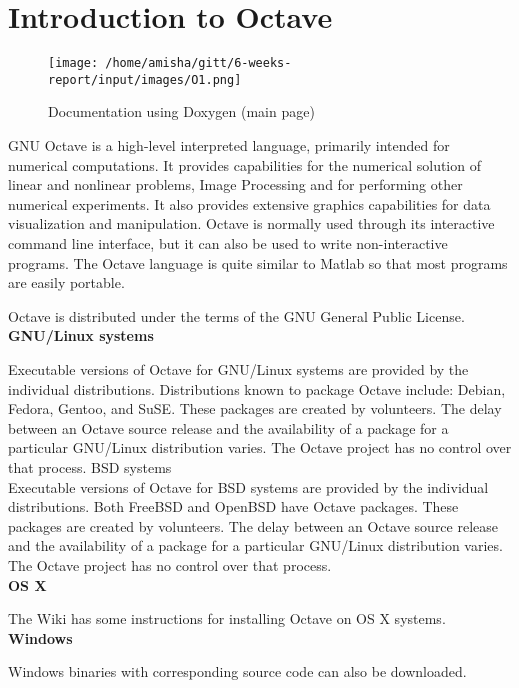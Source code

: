 
\section{ Introduction to Octave}
\begin{figure}[ht]
	\centering \texttt{[image: /home/amisha/gitt/6-weeks-report/input/images/O1.png]}
	\caption{Documentation using Doxygen (main page)}
\end{figure}

 GNU Octave is a high-level interpreted language, primarily intended for numerical computations. It provides capabilities for the numerical solution of linear and nonlinear problems, Image Processing and for performing other numerical experiments. It also provides extensive graphics capabilities for data visualization and manipulation. Octave is normally used through its interactive command line interface, but it can also be used to write non-interactive programs. The Octave language is quite similar to Matlab so that most programs are easily portable.

 Octave is distributed under the terms of the GNU General Public License.\\ 
 
 \textbf{GNU/Linux systems}
 
 Executable versions of Octave for GNU/Linux systems are provided by the individual distributions. Distributions known to package Octave include: Debian, Fedora, Gentoo, and SuSE. These packages are created by volunteers. The delay between an Octave source release and the availability of a package for a particular GNU/Linux distribution varies. The Octave project has no control over that process. 
 BSD systems\\
 
 Executable versions of Octave for BSD systems are provided by the individual distributions. Both FreeBSD and OpenBSD have Octave packages. These packages are created by volunteers. The delay between an Octave source release and the availability of a package for a particular GNU/Linux distribution varies. The Octave project has no control over that process.\\
 
 \textbf{OS X}

 The Wiki has some instructions for installing Octave on OS X systems.\\
 
\textbf{Windows}
 
 Windows binaries with corresponding source code can also be downloaded.
 
